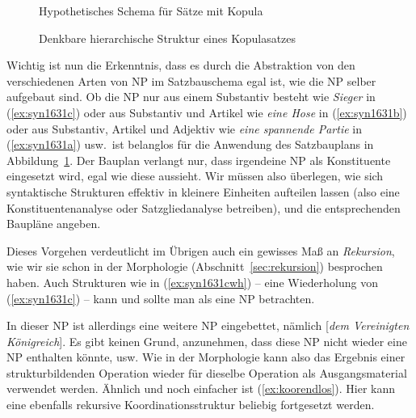 \begin{figure}[!htbp]
  \centering
  \caption{Hypothetisches Schema für Sätze mit Kopula}
  \label{fig:satzbauhyp}
\end{figure}

\begin{figure}[!htbp]
  \centering
  \caption{Denkbare hierarchische Struktur eines Kopulasatzes}
  \label{fig:bspsatzpre}
\end{figure}

Wichtig ist nun die Erkenntnis, dass es durch die Abstraktion von den verschiedenen Arten von NP im Satzbauschema egal ist, wie die NP selber aufgebaut sind.
Ob die NP nur aus einem Substantiv besteht wie \textit{Sieger} in (\ref{ex:syn1631c}) oder aus Substantiv und Artikel wie \textit{eine Hose} in (\ref{ex:syn1631b}) oder aus Substantiv, Artikel und Adjektiv wie \textit{eine spannende Partie} in (\ref{ex:syn1631a}) usw.\ ist belanglos für die Anwendung des Satzbauplans in Abbildung~\ref{fig:satzbauhyp}.
Der Bauplan verlangt nur, dass irgendeine NP als Konstituente eingesetzt wird, egal wie diese aussieht.
Wir müssen also überlegen, wie sich syntaktische Strukturen effektiv in kleinere Einheiten aufteilen lassen (also eine Konstituentenanalyse oder Satzgliedanalyse betreiben), und die entsprechenden Baupläne angeben.


Dieses Vorgehen verdeutlicht im Übrigen auch ein gewisses Maß an \textit{Rekursion}, wie wir sie schon in der Morphologie (Abschnitt~\ref{sec:rekursion}) besprochen haben.
Auch Strukturen wie in (\ref{ex:syn1631cwh}) -- eine Wiederholung von (\ref{ex:syn1631c}) -- kann und sollte man als eine NP betrachten.

\begin{exe}
\end{exe}

In dieser NP ist allerdings eine weitere NP eingebettet, nämlich [\textit{dem Vereinigten Königreich}].
Es gibt keinen Grund, anzunehmen, dass diese NP nicht wieder eine NP enthalten könnte, usw.
Wie in der Morphologie kann also das Ergebnis einer strukturbildenden Operation wieder für dieselbe Operation als Ausgangsmaterial verwendet werden.
Ähnlich und noch einfacher ist (\ref{ex:koorendlos}).
Hier kann eine ebenfalls rekursive Koordinationsstruktur beliebig fortgesetzt werden.\label{abs:syntaxrekursion}


